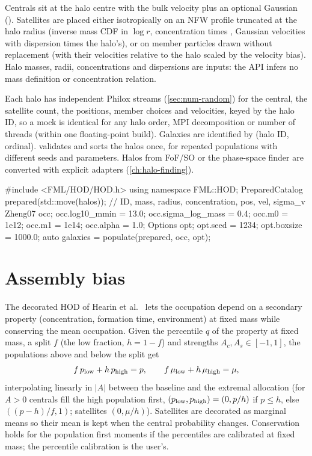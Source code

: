 Centrals sit at the halo centre with the bulk velocity plus an optional Gaussian (). Satellites are placed either
isotropically on an NFW profile truncated at the halo radius (inverse mass CDF in $\log r$, concentration times ,
Gaussian velocities with dispersion  times the halo's), or on member particles drawn without replacement (with their
velocities relative to the halo scaled by the velocity bias). Halo masses, radii, concentrations and dispersions are inputs: the API infers no mass
definition or concentration relation.

Each halo has independent Philox streams (\cref{sec:num-random}) for the central, the satellite count, the positions, member choices and velocities, keyed by
the halo ID, so a mock is identical for any halo order, MPI decomposition or number of threads (within one floating-point build). Galaxies are identified by
(halo ID, ordinal).  validates and sorts the halos once, for repeated populations with different seeds and parameters. Halos from
FoF/SO or the phase-space finder are converted with explicit adapters (\cref{ch:halo-finding}).

\begin{cppcode}
#include <FML/HOD/HOD.h>
using namespace FML::HOD;
PreparedCatalog prepared(std::move(halos));   // ID, mass, radius, concentration, pos, vel, sigma_v
Zheng07 occ;  occ.log10_mmin = 13.0;  occ.sigma_log_mass = 0.4;
occ.m0 = 1e12;  occ.m1 = 1e14;  occ.alpha = 1.0;
Options opt;  opt.seed = 1234;  opt.boxsize = 1000.0;
auto galaxies = populate(prepared, occ, opt);
\end{cppcode}

\section{Assembly bias}\label{sec:hod-assembly}

The decorated HOD of Hearin et al.\ \cite{Hearin2016} lets the occupation depend on a secondary property (concentration, formation time, environment) at fixed
mass while conserving the mean occupation. Given the percentile $q$ of the property at fixed mass, a split $f$ (the low fraction, $h=1-f$) and strengths
$A_c,A_s\in[-1,1]$, the populations above and below the split get
\begin{equation}
f\,p_{\rm low}+h\,p_{\rm high}=p,\qquad f\,\mu_{\rm low}+h\,\mu_{\rm high}=\mu,
\end{equation}
interpolating linearly in $|A|$ between the baseline and the extremal allocation (for $A>0$ centrals fill the high population first, $(p_{\rm low},p_{\rm high})=(0,p/h)$
if $p\le h$, else $((p-h)/f,1)$; satellites $(0,\mu/h)$). Satellites are decorated as marginal means so their mean is kept when the central probability
changes. Conservation holds for the population first moments if the percentiles are calibrated at fixed mass; the percentile calibration is the user's.

